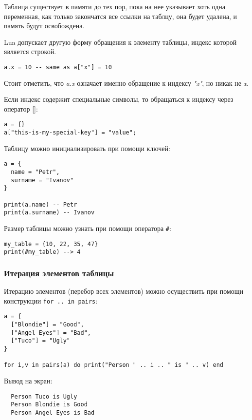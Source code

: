 Таблица существует в памяти до тех пор, пока на нее указывает хоть одна переменная, как только закончатся все ссылки на таблцу, она будет удалена, и память будут освобождена.

Lua допускает другую форму обращения к элементу таблицы, индекс которой является строкой. 

\begin{lstlisting}
a.x = 10 -- same as a["x"] = 10
\end{lstlisting}

Стоит отметить, что \emph{a.x} означает именно обращение к индексу \emph{"x"}, но никак не \emph{x}. 

Если индекс содержит специальные символы, то обращаться к индексу через оператор []:

\begin{lstlisting}
a = {}
a["this-is-my-special-key"] = "value";
\end{lstlisting}

Таблицу можно инициализировать при помощи ключей:

\begin{lstlisting}
a = {
  name = "Petr",
  surname = "Ivanov"
}

print(a.name) -- Petr
print(a.surname) -- Ivanov
\end{lstlisting}

Размер таблицы можно узнать при помощи оператора \lstinline{#}:

\begin{lstlisting}
my_table = {10, 22, 35, 47}
print(#my_table) --> 4
\end{lstlisting}

\subsubsection{Итерация элементов таблицы}

Итерацию элементов (перебор всех элементов) можно осуществить при помощи конструкции \lstinline{for .. in pairs}:

\begin{lstlisting}
a = {
  ["Blondie"] = "Good",
  ["Angel Eyes"] = "Bad",
  ["Tuco"] = "Ugly"
}

for i,v in pairs(a) do print("Person " .. i .. " is " .. v) end
\end{lstlisting}

Вывод на экран:

\begin{lstlisting}
  Person Tuco is Ugly
  Person Blondie is Good
  Person Angel Eyes is Bad
\end{lstlisting}


